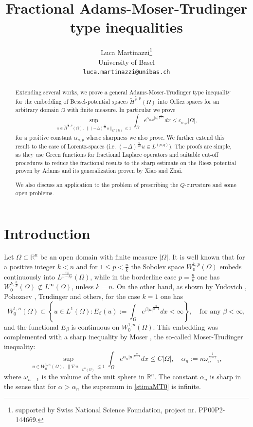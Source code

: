 \documentclass[11pt, a4paper]{article}
\title{Fractional Adams-Moser-Trudinger type inequalities}
\author{Luca Martinazzi\thanks{supported by Swiss National Science Foundation, project nr. PP00P2-144669.}\\ \small{University of Basel}\\
\small \texttt{luca.martinazzi@unibas.ch}}
\newcommand{\R}{\mathbb{R}}
\begin{document}
\maketitle


\begin{abstract} Extending several works, we prove a general Adams-Moser-Trudinger type inequality for the embedding of Bessel-potential spaces $\tilde H^{\frac{n}{p},p}(\Omega)$ into Orlicz spaces for an arbitrary domain $\Omega$ with finite measure. In particular we prove
$$ \sup_{u\in \tilde H^{\frac{n}{p},p}(\Omega), \;\|(-\Delta)^{\frac{n}{2p}}u\|_{L^{p}(\Omega)}\leq 1}\int_{\Omega}e^{\alpha_{n,p} |u|^\frac{p}{p-1}}dx \leq c_{n,p}|\Omega|,
$$
for a positive constant $\alpha_{n,p}$ whose sharpness we also prove. We further extend this result to the case of Lorentz-spaces (i.e. $(-\Delta)^\frac{n}{2p}u\in L^{(p,q)})$. The proofs are simple, as they use Green functions for fractional Laplace operators and suitable cut-off procedures to reduce the fractional results to the sharp estimate on the Riesz potential proven by Adams and its generalization proven by Xiao and Zhai.

We also discuss an application to the problem of prescribing the $Q$-curvature and some open problems.
\end{abstract}




\section{Introduction}


Let $\Omega\subset\R^n$ be an open domain with finite measure $|\Omega|$. It is well known that for a positive integer $k<n$ and for $1\le p<\frac{n}{k}$ the Sobolev space $W^{k,p}_0(\Omega)$ embeds continuously into $L^{\frac{np}{n-kp}}(\Omega)$, while in the borderline case $p=\frac{n}{k}$ one has $W^{k,\frac{n}{k}}_0(\Omega)\not\subset L^\infty(\Omega)$, unless $k=n$. On the other hand, as shown by Yudovich \cite{yud}, Pohozaev \cite{poh}, Trudinger \cite{tru} and others, for the case $k=1$ one has
$$W^{1,n}_0(\Omega)\subset \left\{u\in L^1(\Omega):E_\beta(u):=\int_\Omega e^{\beta |u|^{\frac{n}{n-1}}}dx<\infty  \right\},\quad \text{for any }\beta <\infty,$$
and the functional $E_\beta$ is continuous on $W^{1,n}_0(\Omega)$.
This embedding was complemented with a sharp inequality by Moser \cite{mos}, the so-called Moser-Trudinger inequality: %
\begin{equation}\label{stimaMT0}
\sup_{u\in W^{1,n}_0(\Omega),\;\|\nabla u\|_{L^n(\Omega)}\le 1} \int_\Omega e^{\alpha_n |u|^\frac{n}{n-1}}dx \le C|\Omega|,\quad \alpha_n:=n\omega_{n-1}^\frac{1}{n-1},
\end{equation}
where $\omega_{n-1}$ is the volume of the unit sphere in $\R^n$. The constant $\alpha_n$ is sharp in the sense that for $\alpha>\alpha_n$ the supremum in \eqref{stimaMT0} is infinite.
\end{document}
